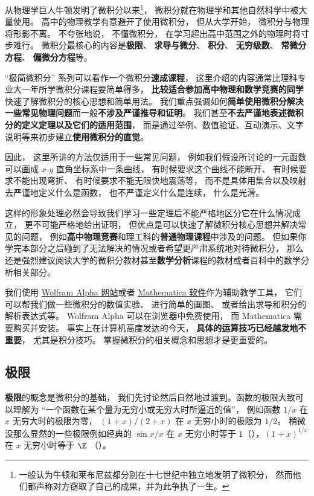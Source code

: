 
\begin{issues}
\issueDraft
\end{issues}

从物理学巨人牛顿发明了微积分以来\footnote{一般认为牛顿和莱布尼兹都分别在十七世纪中独立地发明了微积分， 然而他们都声称对方窃取了自己的成果，并为此争执了一生。}， 微积分就在物理学和其他自然科学中被大量使用。 高中的物理教学有意避开了使用微积分， 但从大学开始， 微积分与物理将形影不离。 不夸张地说， 不懂微积分， 在学习超出高中范围之外的物理时将寸步难行。 微积分最核心的内容是\textbf{极限}、 \textbf{求导与微分}、 \textbf{积分}、 \textbf{无穷级数}、 \textbf{常微分方程}、 \textbf{偏微分方程}等。

“极简微积分” 系列可以看作一个微积分\textbf{速成课程}， 这里介绍的内容通常比理科专业大一年所学微积分课程要简单得多， \textbf{比较适合参加高中物理和数学竞赛的同学}快速了解微积分的核心思想和简单用法。 我们重点强调如何\textbf{简单使用微积分解决一些常见物理问题}而一般\textbf{不涉及严谨推导和证明}。 我们甚至\textbf{不去严谨地表述微积分的定义定理以及它们的适用范围}， 而是通过举例、数值验证、互动演示、文字说明等来初步建立\textbf{使用微积分的直觉}。

因此， 这里所讲的方法仅适用于一些常见问题， 例如我们假设所讨论的一元函数可以画成 $x$-$y$ 直角坐标系中一条曲线， 有时候要求这个曲线不能断开、 有时候要求不能出现弯折、 有时候要求不能无限快地震荡等， 而不是具体用集合以及映射去严谨地定义什么是函数， 也不严谨定义什么是连续， 什么是光滑。

这样的形象处理必然会导致我们学习一些定理后不能严格地区分它在什么情况成立， 更不可能严格地给出证明， 但优点是可以快速了解微积分核心思想并解决常见的问题， 例如\textbf{高中物理竞赛}和理工科的\textbf{普通物理课程}中涉及的问题。 但如果你学完本部分之后碰到了无法解决的情况或者希望更严肃系统地对待微积分， 那么还是强烈建议阅读大学的微积分教材甚至\textbf{数学分析}课程的教材或者百科中的数学分析相关部分。

我们使用 \href{https://www.wolframalpha.com/}{Wolfram Alpha 网站}或者 \href{https://www.wolfram.com/mathematica/}{Mathematica 软件}作为辅助教学工具， 它们可以帮我们做一些微积分的数值实验、 进行简单的画图、 或者给出求导和积分的解析表达式等。 Wolfram Alpha 可以在浏览器中免费使用， 而 Mathematica 需要购买并安装。 事实上在计算机高度发达的今天， \textbf{具体的运算技巧已经越发地不重要}， 尤其是积分技巧。 掌握微积分的相关概念和思想才是更重要的。

\subsection{极限}
\textbf{极限}的概念是微积分的基础， 我们先讨论然后自然地过渡到。函数的极限大致可以理解为 “一个函数在某个量为无穷小或无穷大时所逼近的值”， 例如函数 $1/x$ 在 $x$ 无穷大时的极限为零， $(1+x)/(2+x)$ 在 $x$ 无穷小时的极限为 $1/2$。 稍微没那么显然的一些极限例如经典的 $\sin x/ x$ 在 $x$ 无穷小时等于 $1$（），$(1+x)^{1/x}$ 在 $x$ 无穷小时等于 $\E$ （）。

